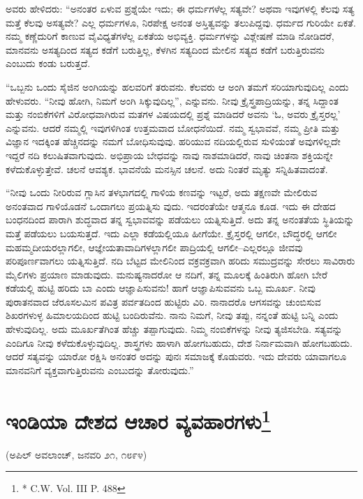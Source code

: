 ಅವರು ಹೇಳಿದರು: “ಅನಂತರ ಏಳುವ ಪ್ರಶ್ನೆಯೇ ಇದು; ಈ ಧರ್ಮಗಳೆಲ್ಲ ಸತ್ಯವೇ? ಅಥವಾ ಇವುಗಳಲ್ಲಿ ಕೆಲವು ಸತ್ಯ ಮತ್ತೆ ಕೆಲವು ಅಸತ್ಯವೇ? ಎಲ್ಲ ಧರ್ಮಗಳೂ, ನಿರಪೇಕ್ಷ ಅನಂತ ಅಸ್ತಿತ್ವವನ್ನು ತಲುಪಿದ್ದವು. ಧರ್ಮದ ಗುರಿಯೇ ಏಕತೆ. ನಮ್ಮ ಕಣ್ಣೆದುರಿಗೆ ಕಾಣುವ ವೈವಿಧ್ಯತೆಗಳೆಲ್ಲ ಏಕತೆಯ ಅಭಿವ್ಯಕ್ತಿ. ಧರ್ಮಗಳನ್ನು ವಿಶ್ಲೇಷಣೆ ಮಾಡಿ ನೋಡಿದರೆ, ಮಾನವನು ಅಸತ್ಯದಿಂದ ಸತ್ಯದ ಕಡೆಗೆ ಬರುತ್ತಿಲ್ಲ, ಕೆಳಗಿನ ಸತ್ಯದಿಂದ ಮೇಲಿನ ಸತ್ಯದ ಕಡೆಗೆ ಬರುತ್ತಿರುವನು ಎಂಬುದು ಕಂಡು ಬರುತ್ತದೆ.

“ಒಬ್ಬನು ಒಂದು ಸೈಜಿನ ಅಂಗಿಯನ್ನು ಹಲವರಿಗೆ ತರುವನು. ಕೆಲವರು ಆ ಅಂಗಿ ತಮಗೆ ಸರಿಯಾಗುವುದಿಲ್ಲ ಎಂದು ಹೇಳುವರು. “ನೀವು ಹೋಗಿ, ನಿಮಗೆ ಅಂಗಿ ಸಿಕ್ಕುವುದಿಲ್ಲ”, ಎನ್ನುವನು. ನೀವು ಕ್ರೈಸ್ತ್ರಪಾದ್ರಿಯನ್ನು, ತನ್ನ ಸಿದ್ದಾಂತ ಮತ್ತು ನಂಬಿಕೆಗಳಿಗೆ ವಿರೋಧವಾಗಿರುವ ಮತಗಳ ವಿಷಯದಲ್ಲಿ ಪ್ರಶ್ನೆ ಮಾಡಿದರೆ ಅವನು ‘ಓ, ಅವರು ಕ್ರೈಸ್ತರಲ್ಲ’ ಎನ್ನುವನು. ಆದರೆ ನಮ್ಮಲ್ಲಿ ಇವುಗಳಿಗಿಂತ ಉತ್ತಮವಾದ ಬೋಧನೆಯಿದೆ. ನಮ್ಮ ಸ್ವಭಾವವೆ, ನಮ್ಮ ಪ್ರೀತಿ ಮತ್ತು ವಿಜ್ಞಾನ ಇದಕ್ಕಿಂತ ಹೆಚ್ಚಿನದನ್ನು ನಮಗೆ ಬೋಧಿಸುವುವು. ಹರಿಯುವ ನದಿಯಲ್ಲಿರುವ ಸುಳಿಯಂತೆ ಅವುಗಳಿಲ್ಲದೇ ಇದ್ದರೆ ನದಿ ಕಲುಷಿತವಾಗುವುದು. ಅಭಿಪ್ರಾಯ ಬೇಧವನ್ನು ನಾವು ನಾಶಮಾಡಿದರೆ, ನಾವು ಚಿಂತನಾ ಶಕ್ತಿಯನ್ನೇ ಕಳೆದುಕೊಳ್ಳುತ್ತೇವೆ. ಚಲನೆ ಆವಶ್ಯಕ. ಭಾವನೆಯೆ ಮನಸ್ಸಿನ ಚಲನೆ. ಅದು ನಿಂತರೆ ಮೃತ್ಯು ಸನ್ನಿಹಿತವಾದಂತೆ.

“ನೀವು ಒಂದು ನೀರಿರುವ ಗ್ಲಾಸಿನ ತಳಭಾಗದಲ್ಲಿ ಗಾಳಿಯ ಕಣವನ್ನು ಇಟ್ಟರೆ, ಅದು ತಕ್ಷಣವೇ ಮೇಲಿರುವ ಅನಂತವಾದ ಗಾಳಿಯೊಡನೆ ಒಂದಾಗಲು ಪ್ರಯತ್ನಿಸು ವುದು. ಇದರಂತೆಯೇ ಆತ್ಮನೂ ಕೂಡ. ಇದು ಈ ದೇಹದ ಬಂಧನದಿಂದ ಪಾರಾಗಿ ಶುದ್ಧವಾದ ತನ್ನ ಸ್ವಭಾವವನ್ನು ಪಡೆಯಲು ಯತ್ನಿಸುತ್ತಿದೆ. ಅದು ತನ್ನ ಅನಂತತೆಯ ಸ್ಥಿತಿಯನ್ನು ಮತ್ತೆ ಪಡೆಯಲು ಬಯಸುತ್ತದೆ. ಇದು ಎಲ್ಲಾ ಕಡೆಯಲ್ಲಿಯೂ ಹೀಗೆಯೇ. ಕ್ರೈಸ್ತರಲ್ಲಿ ಆಗಲೀ, ಬೌದ್ಧರಲ್ಲಿ ಆಗಲೀ ಮಹಮ್ಮದೀಯರಲ್ಲಾಗಲೀ, ಆಜ್ಞೇಯತಾವಾದಿಗಳಲ್ಲಾಗಲೀ ಪಾದ್ರಿಯಲ್ಲಿ ಆಗಲೀ–ಎಲ್ಲರಲ್ಲೂ ಜೀವವು ಪರಿಪೂರ್ಣವಾಗಲು ಯತ್ನಿಸುತ್ತಿದೆ. ನದಿ ಬೆಟ್ಟದ ಮೇಲಿನಿಂದ ವಕ್ರವಕ್ರವಾಗಿ ಹರಿದು ಸಮುದ್ರವನ್ನು ಸೇರಲು ಸಾವಿರಾರು ಮೈಲಿಗಳು ಪ್ರಯಾಣ ಮಾಡುವುದು. ಮನುಷ್ಯನಾದರೋ ಆ ನದಿಗೆ, ತನ್ನ ಮೂಲಕ್ಕೆ ಹಿಂತಿರುಗಿ ಹೋಗಿ ಬೇರೆ ಕಡೆಯಲ್ಲಿ ಹುಟ್ಟಿ ಹರಿದು ಬಾ ಎಂದು ಆಜ್ಞಾಪಿಸುವನು! ಹಾಗೆ ಆಜ್ಞಾಪಿಸುವವನು ಒಬ್ಬ ಮೂರ್ಖ. ನೀವು ಪುರಾತನವಾದ ಜೆರೂಸಲಮಿನ ಪವಿತ್ರ ಪರ್ವತದಿಂದ ಹುಟ್ಟಿರು ವಿರಿ. ನಾನಾದರೊ ಆಗಸವನ್ನು ಚುಂಬಿಸುವ ಶಿಖರಗಳುಳ್ಳ ಹಿಮಾಲಯದಿಂದ ಹುಟ್ಟಿ ಬಂದಿರುವೆನು. ನಾನು ನಿಮಗೆ, ನೀವು ತಪ್ಪು, ನನ್ನಂತೆ ಹುಟ್ಟಿ ಬನ್ನಿ ಎಂದು ಹೇಳುವುದಿಲ್ಲ. ಅದು ಮೂರ್ಖತೆಗಿಂತ ಹೆಚ್ಚು ತಪ್ಪಾಗುವುದು. ನಿಮ್ಮ ನಂಬಿಕೆಗಳನ್ನು ನೀವು ತ್ಯಜಿಸಬೇಡಿ. ಸತ್ಯವನ್ನು ಎಂದಿಗೂ ನೀವು ಕಳೆದುಕೊಳ್ಳುವುದಿಲ್ಲ. ಶಾಸ್ತ್ರಗಳು ಹಾಳಾಗಿ ಹೋಗಬಹುದು, ದೇಶ ನಿರ್ನಾಮವಾಗಿ ಹೋಗಬಹುದು. ಆದರೆ ಸತ್ಯವನ್ನು ಯಾರೋ ರಕ್ಷಿಸಿ ಅನಂತರ ಅದನ್ನು ಪುನಃ ಸಮಾಜಕ್ಕೆ ಕೊಡುವರು. ಇದು ದೇವರು ಯಾವಾಗಲೂ ಮಾನವನಿಗೆ ವ್ಯಕ್ತವಾಗುತ್ತಿರುವನು ಎಂಬುದನ್ನು ತೋರುವುದು.”


\section[ಇಂಡಿಯಾ ದೇಶದ ಆಚಾರ ವ್ಯವಹಾರಗಳು]{ಇಂಡಿಯಾ ದೇಶದ ಆಚಾರ ವ್ಯವಹಾರಗಳು\protect\footnote{* C.W. Vol. III P. 488}}

\begin{center}
(ಅಪಿಲ್​ ಅವಲಾಂಚ್​, ಜನವರಿ ೨೧, ೧೮೯೪)
\end{center}

